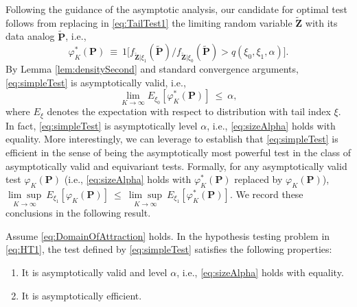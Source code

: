 Following the guidance of the asymptotic analysis, our candidate for optimal test follows from replacing in \eqref{eq:TailTest1} the limiting random variable $\mathbf{\tilde{Z}}$ with its data analog $\mathbf{\tilde{P}}$, i.e., 
\begin{equation}
\varphi _{K}^{\ast }( \mathbf{P}) ~\equiv
~1\big[ {f_{\mathbf{\tilde{Z}}|\xi _{1}}( \mathbf{\tilde{P}}) }/{f_{\mathbf{\tilde{Z}}|\xi _{0}}( \mathbf{\tilde{P}}) }>q( \xi _{0},\xi_{1},\alpha ) \big] . \label{eq:simpleTest}
\end{equation}
By Lemma \ref{lem:densitySecond} and standard convergence arguments, \eqref{eq:simpleTest} is asymptotically valid, i.e.,
\begin{equation}
\lim_{K\to \infty }E_{\xi _{0}}[ \varphi _{K}^{\ast }( \mathbf{P}) ] ~\leq ~\alpha ,  \label{eq:sizeAlpha}
\end{equation}
where $E_{\xi } $ denotes the expectation with respect to distribution with tail index $\xi $. 
In fact, \eqref{eq:simpleTest} is asymptotically level $\alpha $, i.e., \eqref{eq:sizeAlpha} holds with equality. More interestingly, we can leverage \citet[Theorem 1]{muller:2011} to establish that \eqref{eq:simpleTest} is efficient in the sense of being the asymptotically most powerful test in the class of asymptotically valid and equivariant tests. Formally, for any asymptotically valid test $\varphi _{K}( \mathbf{P}) $ (i.e., \eqref{eq:sizeAlpha} holds with $\varphi _{K}^{\ast }( \mathbf{P}) $ replaced by $\varphi _{K}( \mathbf{P}) $),
$
\underset{K\to \infty }{\lim \sup }~E_{\xi _{1}}[ \varphi _{K}( \mathbf{P}) ] ~\leq ~\underset{K\to \infty }{\lim \sup }~E_{\xi _{1}}[ \varphi _{K}^{\ast }( \mathbf{{{P}}}) ] .
$
We record these conclusions in the following result.

\begin{theorem}\label{thm:simpleTest}
Assume \eqref{eq:DomainOfAttraction} holds. In the hypothesis testing problem in \eqref{eq:HT1}, the test defined by \eqref{eq:simpleTest} satisfies the following properties:
\begin{enumerate}
\item It is asymptotically valid and level $\alpha$, i.e., \eqref{eq:sizeAlpha} holds with equality.
\item It is asymptotically efficient.
\end{enumerate}
\end{theorem}

